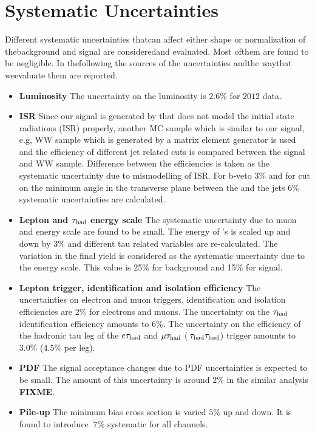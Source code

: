 \section{Systematic Uncertainties}
\label{sect:sys}
Different systematic uncertainties thatcan affect either shape or normalization of thebackground and  signal are consideredand evaluated.
Most ofthem are found to be negligible. In thefollowing the sources of the uncertainties andthe waythat weevaluate them are reported.
\begin {itemize}
\item{{\bf Luminosity}} The uncertainty on the luminosity  is $2.6\%$ for $2012$ data.
\item{\bf ISR}
Since our signal is generated by \PYTHIA that does not  model the initial state radiations (ISR) properly, another MC sample which is similar to our signal, e.g, WW sample 
which is generated by a matrix element generator is used and the efficiency of different jet related cuts is compared between the signal and WW sample. Difference between the
efficiencies is taken as the systematic uncertainty due to mismodelling of ISR. For b-veto 3\% and for cut on   the minimum angle in the transverse plane between 
the \MET and the jets 6\% systematic uncertainties are  calculated.  
\item{\bf Lepton and $\tau_{\rm had}$ energy scale}
The systematic uncertainty due to muon and  energy scale are found to be small.
The energy of \hadtau's is scaled up and down by $3\%$ and different tau related variables are re-calculated.  The variation in the final yield is considered as the
systematic uncertainty due to the \Tau energy scale. This value is 25\% for background and 15\% for signal.
\item{\bf Lepton trigger, identification and isolation efficiency}
The uncertainties on electron and muon triggers, identification and isolation efficiencies are $2\%$ for electrons and muons. 
The uncertainty on the $\tau_{\rm had}$ identification efficiency amounts to $6\%$. 
The uncertainty on the efficiency of the hadronic tau leg of the $e\tau_{\rm had}$ and $\mu\tau_{\rm had}$ ($\,\tau_{\rm had}\tau_{\rm had}$) trigger amounts to $3.0\%$ ($4.5\%$ per leg).
\item{\bf PDF}
The signal acceptance changes due to PDF uncertainties is expected to be small. 
The amount of this uncertainty is around $2\%$ in the similar analysis {\bf FIXME}.
\item{\bf Pile-up}
The minimum bias cross section is varied $5 \%$ up and down. It is found to introduce $~7 \%$ systematic for all channels.    
\end{itemize}


